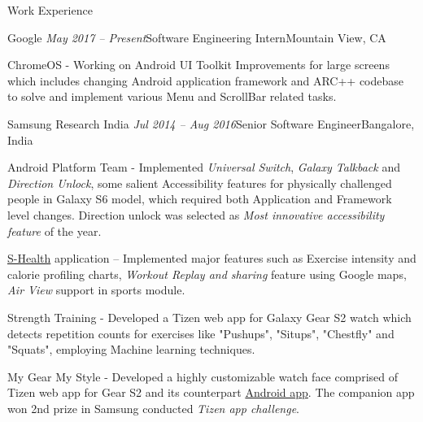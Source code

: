 \documentclass{resume} %
\begin{document}

\begin{rSection}{Work Experience}


\begin{rSubsection}{Google}{\emph{ May 2017 -- Present}}{Software Engineering Intern}{Mountain View, CA}
\item ChromeOS - Working on Android UI Toolkit Improvements for large screens which includes changing Android application framework and ARC++ codebase to solve and implement various Menu and ScrollBar related tasks.
\end{rSubsection}


\begin{rSubsection}{Samsung Research India}{\emph{ Jul 2014 -- Aug 2016}}{Senior Software Engineer}{Bangalore, India}
\item Android Platform Team - Implemented {\emph{Universal Switch}}, {\emph{Galaxy Talkback}} and {\emph{Direction Unlock}}, some salient Accessibility features for physically challenged people in Galaxy S6 model, which required both Application and Framework level changes. Direction unlock was selected as {\emph{Most innovative accessibility feature}} of the year.
\item \href{https://play.google.com/store/apps/details?id=com.sec.android.app.shealth&hl=en}{S-Health} application -- Implemented major features such as Exercise intensity and calorie profiling charts, {\emph{Workout Replay and sharing}} feature using Google maps, {\emph{Air View}} support in sports module.
\item Strength Training - Developed a Tizen web app for Galaxy Gear S2 watch which detects repetition counts for exercises like "Pushups", "Situps", "Chestfly" and "Squats", employing Machine learning techniques.
\item My Gear My Style - Developed a highly customizable watch face comprised of Tizen web app for Gear S2 and its counterpart \href{https://play.google.com/store/apps/details?id=com.samsung.mygearmystyle&hl=en}{Android app}. The companion app won 2nd prize in Samsung conducted {\emph{Tizen app challenge}}.
\end{rSubsection}


\end{rSection}
\end{document}
